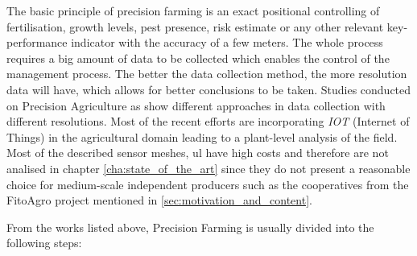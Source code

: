 The basic principle of precision farming is an exact positional controlling of fertilisation, growth levels, pest presence, risk estimate or any other relevant key-performance indicator with the accuracy of a few meters. The whole process requires a big amount of data to be collected which enables the control of the management process. The better the data collection method, the more resolution data will have, which allows for better conclusions to be taken. Studies conducted on Precision Agriculture as \cite{Khanal2017} \cite{Talavera2017} \cite{Kruize2016} \cite{Culibrina2015} \cite{Jawad2017} \cite{Resu2015} \cite{Alam2014} \cite{JointResearchCentreJRCoftheEuropeanCommission2014} \cite{Mohanraj2016} \cite{Sankaran2010} \cite{Nip2003} show different approaches in data collection with different resolutions. Most of the recent efforts are incorporating \emph{IOT} (Internet of Things) in the agricultural domain leading to a plant-level analysis of the field. Most of the described sensor meshes, ul have high costs and therefore are not analised in chapter \ref{cha:state_of_the_art} since they do not present a reasonable choice for medium-scale independent producers such as the cooperatives from the FitoAgro project mentioned in \ref{sec:motivation_and_content}.

From the works listed above, Precision Farming is usually divided into the following steps:

